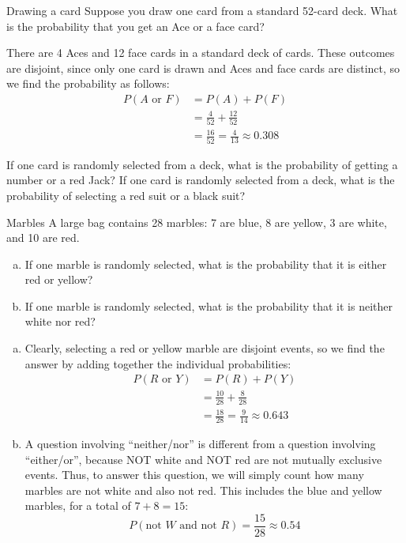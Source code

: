 \begin{example}[https://www.youtube.com/watch?v=uD6AB7t_Das]{Drawing a card}
Suppose you draw one card from a standard 52-card deck. What is the probability that you get an Ace or a face card? 

\sol
There are 4 Aces and 12 face cards in a standard deck of cards. These outcomes are disjoint, since only one card is drawn and Aces and face cards are distinct, so we find the probability as follows:
\begin{align*}
P( A \mbox{ or } F ) &= P(A) + P(F)\\
&= \frac{4}{52} + \frac{12}{52}\\
&= \boxed{\frac{16}{52} = \frac{4}{13} \approx 0.308}
\end{align*}
\end{example}
\vfill

\begin{try}
If one card is randomly selected from a deck, what is the probability of getting a number or a red Jack? If one card is randomly selected from a deck, what is the probability of selecting a red suit or a black suit?
\end{try}
\vfill
\pagebreak

\begin{example}[https://www.youtube.com/watch?v=eS3h94W2Lnk]{Marbles}
A large bag contains 28 marbles: 7 are blue, 8 are yellow, 3 are white, and 10 are  red. 
\begin{enumerate}[(a)]
\item If one marble is randomly selected, what is the probability that it is either red or yellow?
\item If one marble is randomly selected, what is the probability that it is neither white nor red?
\end{enumerate}

\sol
\begin{enumerate}[(a)]
\item Clearly, selecting a red or yellow marble are disjoint events, so we find the answer by adding together the individual probabilities:
\begin{align*}
P( R \mbox{ or } Y ) &= P(R) + P(Y)\\
&= \frac{10}{28} + \frac{8}{28}\\
&= \boxed{\frac{18}{28} = \frac{9}{14} \approx 0.643}
\end{align*}
\item A question involving ``neither/nor'' is different from a question involving ``either/or'', because NOT white and NOT red are not mutually exclusive events.  Thus, to answer this question, we will simply count how many marbles are not white and also not red.  This includes the blue and yellow marbles, for a total of $7 + 8 = 15$:
\[P(\textrm{not } W \textrm{ and not } R) = \boxed{\dfrac{15}{28} \approx 0.54}\]
\end{enumerate}
\end{example}


